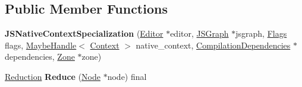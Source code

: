 \subsection*{Public Member Functions}
\begin{DoxyCompactItemize}
\item 
{\bfseries J\+S\+Native\+Context\+Specialization} (\hyperlink{classv8_1_1internal_1_1compiler_1_1_advanced_reducer_1_1_editor}{Editor} $\ast$editor, \hyperlink{classv8_1_1internal_1_1compiler_1_1_j_s_graph}{J\+S\+Graph} $\ast$jsgraph, \hyperlink{classv8_1_1base_1_1_flags}{Flags} flags, \hyperlink{classv8_1_1internal_1_1_maybe_handle}{Maybe\+Handle}$<$ \hyperlink{classv8_1_1internal_1_1_context}{Context} $>$ native\+\_\+context, \hyperlink{classv8_1_1internal_1_1_compilation_dependencies}{Compilation\+Dependencies} $\ast$dependencies, \hyperlink{classv8_1_1internal_1_1_zone}{Zone} $\ast$zone)\hypertarget{classv8_1_1internal_1_1compiler_1_1_j_s_native_context_specialization_a8b207c52f18156b4faf1969798a62482}{}\label{classv8_1_1internal_1_1compiler_1_1_j_s_native_context_specialization_a8b207c52f18156b4faf1969798a62482}

\item 
\hyperlink{classv8_1_1internal_1_1compiler_1_1_reduction}{Reduction} {\bfseries Reduce} (\hyperlink{classv8_1_1internal_1_1compiler_1_1_node}{Node} $\ast$node) final\hypertarget{classv8_1_1internal_1_1compiler_1_1_j_s_native_context_specialization_ae691af2aa397791c9bbb927e6fd705dd}{}\label{classv8_1_1internal_1_1compiler_1_1_j_s_native_context_specialization_ae691af2aa397791c9bbb927e6fd705dd}

\end{DoxyCompactItemize}
